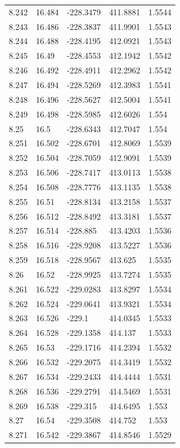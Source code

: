 \begin{tabular}{lllll}
8.242 & 16.484 & -228.3479 & 411.8881 & 1.5544 \\
8.243 & 16.486 & -228.3837 & 411.9901 & 1.5543 \\
8.244 & 16.488 & -228.4195 & 412.0921 & 1.5543 \\
8.245 & 16.49 & -228.4553 & 412.1942 & 1.5542 \\
8.246 & 16.492 & -228.4911 & 412.2962 & 1.5542 \\
8.247 & 16.494 & -228.5269 & 412.3983 & 1.5541 \\
8.248 & 16.496 & -228.5627 & 412.5004 & 1.5541 \\
8.249 & 16.498 & -228.5985 & 412.6026 & 1.554 \\
8.25 & 16.5 & -228.6343 & 412.7047 & 1.554 \\
8.251 & 16.502 & -228.6701 & 412.8069 & 1.5539 \\
8.252 & 16.504 & -228.7059 & 412.9091 & 1.5539 \\
8.253 & 16.506 & -228.7417 & 413.0113 & 1.5538 \\
8.254 & 16.508 & -228.7776 & 413.1135 & 1.5538 \\
8.255 & 16.51 & -228.8134 & 413.2158 & 1.5537 \\
8.256 & 16.512 & -228.8492 & 413.3181 & 1.5537 \\
8.257 & 16.514 & -228.885 & 413.4203 & 1.5536 \\
8.258 & 16.516 & -228.9208 & 413.5227 & 1.5536 \\
8.259 & 16.518 & -228.9567 & 413.625 & 1.5535 \\
8.26 & 16.52 & -228.9925 & 413.7274 & 1.5535 \\
8.261 & 16.522 & -229.0283 & 413.8297 & 1.5534 \\
8.262 & 16.524 & -229.0641 & 413.9321 & 1.5534 \\
8.263 & 16.526 & -229.1 & 414.0345 & 1.5533 \\
8.264 & 16.528 & -229.1358 & 414.137 & 1.5533 \\
8.265 & 16.53 & -229.1716 & 414.2394 & 1.5532 \\
8.266 & 16.532 & -229.2075 & 414.3419 & 1.5532 \\
8.267 & 16.534 & -229.2433 & 414.4444 & 1.5531 \\
8.268 & 16.536 & -229.2791 & 414.5469 & 1.5531 \\
8.269 & 16.538 & -229.315 & 414.6495 & 1.553 \\
8.27 & 16.54 & -229.3508 & 414.752 & 1.553 \\
8.271 & 16.542 & -229.3867 & 414.8546 & 1.5529 \\

\end{tabular}
